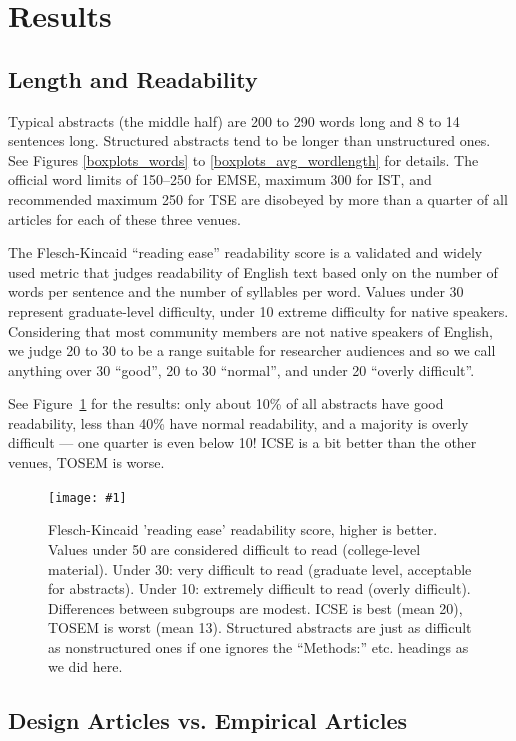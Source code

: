 \documentclass[10pt,journal,compsoc]{IEEEtran}
\newcommand{\ifarxiv}[1]{#1}  %
\newcommand{\Plot}[2]{%
	\begin{figure}[htb]%
		\centering\texttt{[image: \#1]}%
		\vspace{-4mm}\caption{#2}\label{#1}%
	\end{figure}}
\begin{document}
\section{Results}

\subsection{Length and Readability}

Typical abstracts (the middle half) are 200 to 290 words long
and 8 to 14 sentences long.
Structured abstracts tend to be longer than unstructured ones.
\ifarxiv{See Figures \ref{boxplots_words} to \ref{boxplots_avg_wordlength} for details.}
The official word limits of
150--250 for EMSE,
maximum 300 for IST, and
recommended maximum 250 for TSE
are disobeyed by more than a quarter of all articles for each of these three venues.

The Flesch-Kincaid ``reading ease'' readability score \cite{KinFisRog75}
is a validated and widely used metric that judges readability of English text
based only on the number of words per sentence and the number of
syllables per word.
Values under 30 represent graduate-level difficulty,
under 10 extreme difficulty for native speakers.
Considering that most community members are not native speakers of English,
we judge 20 to 30 to be a range suitable for researcher audiences and so
we call anything over 30 ``good'',
20 to 30 ``normal'', and
under 20 ``overly difficult''.

See Figure~\ref{boxplots_fkscore} for the results:
only about 10\% of all abstracts have good readability,
less than 40\% have normal readability,
and a majority is overly difficult --- one quarter is even below 10!
ICSE is a bit better than the other venues,
TOSEM is worse.

\Plot{boxplots_fkscore}{%
	Flesch-Kincaid 'reading ease' readability score, higher is better.
    Values under 50 are considered difficult to read (college-level material).
    Under 30: very difficult to read (graduate level, acceptable for abstracts).
	Under 10: extremely difficult to read (overly difficult).
    Differences between subgroups are modest.
	ICSE is best (mean 20), TOSEM is worst (mean 13).
    Structured abstracts are just as difficult as nonstructured ones
    if one ignores the ``Methods:'' etc. headings as we did here.
}


\subsection{Design Articles vs. Empirical Articles}
\end{document}
